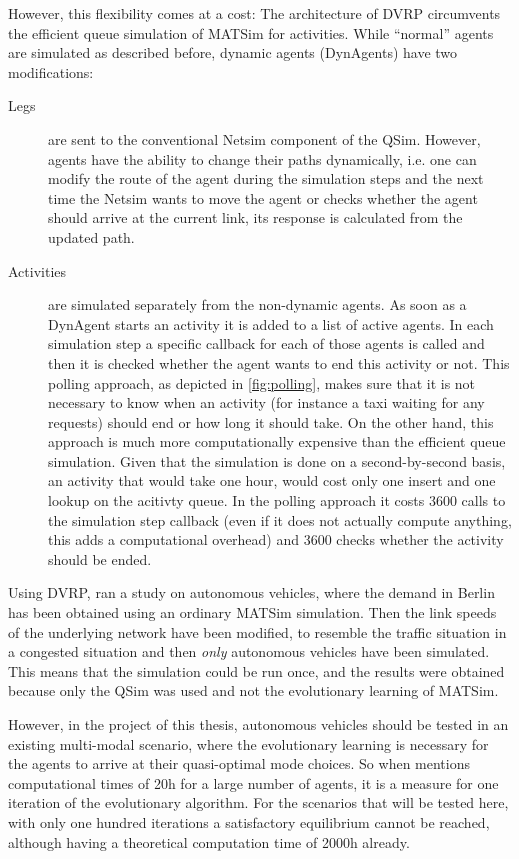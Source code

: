 However, this flexibility comes at a cost: The architecture of DVRP
circumvents the efficient queue simulation of MATSim for activities. While ``normal''
agents are simulated as described before, dynamic agents (DynAgents) have two
modifications:

\begin{description}
\item[Legs] are sent to the conventional Netsim component of the QSim. However, agents have the ability
to change their paths dynamically, i.e. one can modify the route of the agent
during the simulation steps and the next time the Netsim wants to move the agent
or checks whether the agent should arrive at the current link, its response is
calculated from the updated path.
\item[Activities] are simulated separately from the non-dynamic agents. As soon
as a DynAgent starts an activity it is added to a list of active agents. In each
simulation step a specific callback for each of those agents is called and then
it is checked whether the agent wants to end this activity or not.
This polling approach, as depicted in \cref{fig:polling}, makes sure that it is
not necessary to know when an activity (for instance a taxi waiting for any
requests) should end or how long it should take. On the other hand, this approach
is much more computationally expensive than the efficient queue simulation.
Given that the simulation is done on a second-by-second basis, an activity that
would take one hour, would cost only one insert and one lookup on the acitivty queue.
In the polling approach it costs 3600 calls to the simulation step callback (even
if it does not actually compute anything, this adds a computational overhead) and
3600 checks whether the activity should be ended.
\end{description}

Using DVRP, \citet{Bischoff2016} ran a study
on autonomous vehicles, where the demand in Berlin has been
obtained using an ordinary MATSim simulation. Then the link speeds of the underlying
network have been modified, to resemble the traffic situation in a congested
situation and then \textit{only} autonomous vehicles have been simulated. This
means that the simulation could be run once, and the results were obtained because
only the QSim was used and not the evolutionary learning of MATSim.

However, in the project of this thesis, autonomous vehicles should be tested in
an existing multi-modal scenario, where the evolutionary learning is necessary
for the agents to arrive at their quasi-optimal mode choices. So when
\citet{Bischoff2016} mentions computational times of 20h for a large number of agents,
it is a measure for one iteration of the evolutionary algorithm. For the scenarios
that will be tested here, with only one hundred iterations a satisfactory
equilibrium cannot be reached, although having a theoretical computation time of 2000h already.

